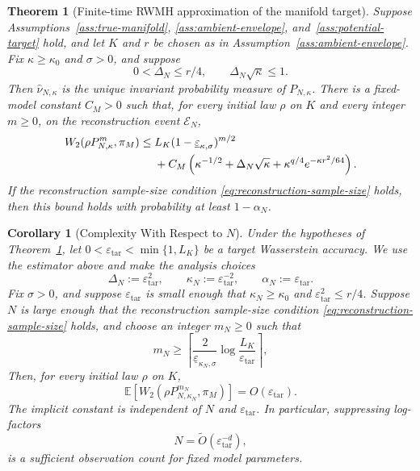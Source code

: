 \documentclass[10pt,a4paper]{amsart}
\newtheorem{theorem}{Theorem}
\newtheorem{corollary}{Corollary}
\newcommand{\E}{\mathbb E}
\newcommand{\cE}{\mathcal E}
\newcommand{\eps}{\varepsilon}
\renewcommand{\epsilon}{\eps}
\newcommand{\whatnu}{\widehat\nu_{N,\kappa}}
\begin{document}
\begin{theorem}[Finite-time RWMH approximation of the manifold target]
\label{thm:rwmh-end-to-end}
Suppose Assumptions~\ref{ass:true-manifold},
\ref{ass:ambient-envelope}, and~\ref{ass:potential-target} hold, and let
$K$ and $r$ be chosen as in Assumption~\ref{ass:ambient-envelope}. Fix $\kappa\ge\kappa_0$ and $\sigma>0$,
and suppose
\[
 0<\Delta_N\le r/4,
 \qquad
 \Delta_N\sqrt\kappa\le1.
\]
Then $\whatnu$ is the unique invariant probability measure of
$P_{N,\kappa}$. There is a fixed-model constant $C_M>0$ such that,
for every initial law $\rho$ on $K$ and every integer $m\ge0$,
on the reconstruction event $\cE_N$,
\begin{align}
 W_2(\rho P_{N,\kappa}^m,\pi_M)
 \le{}&L_K(1-\underline\varepsilon_{\kappa,\sigma})^{m/2}
 \notag\\
 &+C_M\left(
 \kappa^{-1/2}+\Delta_N\sqrt\kappa
 +\kappa^{q/4}e^{-\kappa r^2/64}
 \right).
\label{eq:rwmh-end-to-end}
\end{align}
If the reconstruction sample-size condition
\eqref{eq:reconstruction-sample-size} holds, then this bound holds with
probability at least $1-\alpha_N$.
\end{theorem}

\begin{corollary}[Complexity With Respect to $N$]
\label{cor:rwmh-expected-rate}
Under the hypotheses of Theorem~\ref{thm:rwmh-end-to-end}, let
$0<\epsilon_{\mathrm{tar}}<\min\{1,L_K\}$ be a target Wasserstein accuracy. We use the estimator above and make the analysis choices
\[
 \Delta_N:=\epsilon_{\mathrm{tar}}^2,
 \qquad
 \kappa_N:=\epsilon_{\mathrm{tar}}^{-2},
 \qquad
 \alpha_N:=\epsilon_{\mathrm{tar}}.
\]
Fix $\sigma>0$, and suppose $\epsilon_{\mathrm{tar}}$ is small enough that
$\kappa_N\ge\kappa_0$ and
$\epsilon_{\mathrm{tar}}^2\le r/4$. Suppose $N$ is large enough that the
reconstruction sample-size condition \eqref{eq:reconstruction-sample-size}
holds,
and choose an integer $m_N\ge0$ such that
\begin{equation}
 m_N
 \ge
 \left\lceil
 \frac{2}{\underline\varepsilon_{\kappa_N,\sigma}}
 \log\frac{L_K}{\epsilon_{\mathrm{tar}}}
\right\rceil,
\label{eq:rwmh-optimized-iterations}
\end{equation}
Then, for every initial law $\rho$ on $K$,
\begin{equation}
 \E\left[
 W_2(\rho P_{N,\kappa_N}^{m_N},\pi_M)
 \right]
 =O(\epsilon_{\mathrm{tar}}).
\label{eq:rwmh-expected-rate}
\end{equation}
The implicit constant is independent of $N$ and
$\epsilon_{\mathrm{tar}}$. In particular, suppressing log-factors
\[
 N=\widetilde O\left(
 \epsilon_{\mathrm{tar}}^{-d}
 \right),
\]
is a sufficient observation count for fixed model parameters.
\end{corollary}
\end{document}
